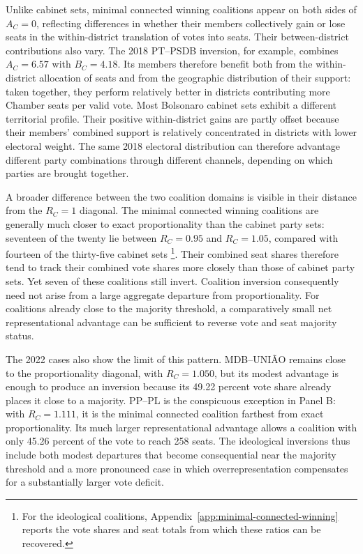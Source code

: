 \documentclass[11pt]{article}
\begin{document}
Unlike cabinet sets, minimal connected winning coalitions appear on both sides
of \(A_C=0\), reflecting differences in whether their members collectively gain
or lose seats in the within-district translation of votes into seats. Their
between-district contributions also vary. The 2018 PT--PSDB inversion, for
example, combines \(A_C=6.57\) with \(B_C=4.18\). Its members therefore benefit
both from the within-district allocation of seats and from the geographic
distribution of their support: taken together, they perform relatively better
in districts contributing more Chamber seats per valid vote. Most Bolsonaro
cabinet sets exhibit a different territorial profile. Their positive
within-district gains are partly offset because their members' combined support
is relatively concentrated in districts with lower electoral weight. The same
2018 electoral distribution can therefore advantage different party
combinations through different channels, depending on which parties are brought
together.

A broader difference between the two coalition domains is visible in their
distance from the \(R_C=1\) diagonal. The minimal connected winning coalitions
are generally much closer to exact proportionality than the cabinet party sets:
seventeen of the twenty lie between \(R_C=0.95\) and \(R_C=1.05\), compared with
fourteen of the thirty-five cabinet sets \footnote{
For the ideological coalitions, Appendix~\ref{app:minimal-connected-winning}
reports the vote shares and seat totals from which these ratios
can be recovered.}. Their combined seat shares therefore
tend to track their combined vote shares more closely than those of cabinet
party sets. Yet seven of these coalitions still invert. Coalition inversion
consequently need not arise from a large aggregate departure from
proportionality. For coalitions already close to the majority threshold, a
comparatively small net representational advantage can be sufficient to reverse
vote and seat majority status.

The 2022 cases also show the limit of this pattern. MDB--UNI\~AO remains close
to the proportionality diagonal, with \(R_C=1.050\), but its modest advantage
is enough to produce an inversion because its 49.22 percent vote share already
places it close to a majority. PP--PL is the conspicuous exception in Panel B:
with \(R_C=1.111\), it is the minimal connected coalition farthest from exact
proportionality. Its much larger representational advantage allows a coalition
with only 45.26 percent of the vote to reach 258 seats. The ideological
inversions thus include both modest departures that become consequential near
the majority threshold and a more pronounced case in which overrepresentation
compensates for a substantially larger vote deficit.
\end{document}
